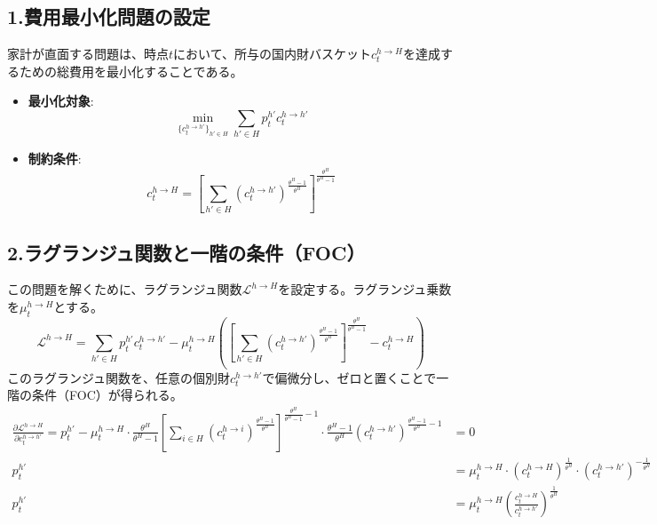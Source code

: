 \subsection*{1.費用最小化問題の設定}
\label{sec:appendix_cost_minimization_sub1}
家計が直面する問題は、時点\(t\)において、所与の国内財バスケット\(c_t^{h\to H}\)を達成するための総費用を最小化することである。
\begin{itemize}
    \item\label{itm:appendix_cost_minimization_sub1_obj} \textbf{最小化対象}:
    \begin{equation}
    \min_{\{c_t^{h\to h'}\}_{h'\in H}}\sum_{h'\in H}p_t^{h'}c_t^{h\to h'}
    \label{eq:appendix_cost_minimization_sub1_objective}
    \end{equation}
    \item\label{itm:appendix_cost_minimization_sub1_const} \textbf{制約条件}:
    \begin{equation}
    c_t^{h\to H}=\left[\sum_{h'\in H}(c_t^{h\to h'})^{\frac{\theta^H-1}{\theta^H}}\right]^{\frac{\theta^H}{\theta^H-1}}
    \label{eq:appendix_cost_minimization_sub1_constraint}
    \end{equation}
\end{itemize}

\subsection*{2.ラグランジュ関数と一階の条件（FOC）}
\label{sec:appendix_cost_minimization_sub2}
この問題を解くために、ラグランジュ関数\(\mathcal{L}^{h\to H}\)を設定する。ラグランジュ乗数を\(\mu_t^{h\to H}\)とする。
\begin{equation}
\mathcal{L}^{h\to H}=\sum_{h'\in H}p_t^{h'}c_t^{h\to h'}-\mu_t^{h\to H}\left(\left[\sum_{h'\in H}(c_t^{h\to h'})^{\frac{\theta^H-1}{\theta^H}}\right]^{\frac{\theta^H}{\theta^H-1}}-c_t^{h\to H}\right)
\label{eq:appendix_cost_minimization_sub2_lagrangian}
\end{equation}
このラグランジュ関数を、任意の個別財\(c_t^{h\to h'}\)で偏微分し、ゼロと置くことで一階の条件（FOC）が得られる。
\begin{align}
\frac{\partial\mathcal{L}^{h\to H}}{\partial c_t^{h\to h'}}=p_t^{h'}-\mu_t^{h\to H}\cdot\frac{\theta^H}{\theta^H-1}\left[\sum_{i\in H}(c_t^{h\to i})^{\frac{\theta^H-1}{\theta^H}}\right]^{\frac{\theta^H}{\theta^H-1}-1}\cdot\frac{\theta^H-1}{\theta^H}(c_t^{h\to h'})^{\frac{\theta^H-1}{\theta^H}-1}&=0 \label{eq:appendix_cost_minimization_sub2_foc_step1} \\
p_t^{h'}&=\mu_t^{h\to H}\cdot(c_t^{h\to H})^{\frac{1}{\theta^H}}\cdot(c_t^{h\to h'})^{-\frac{1}{\theta^H}} \label{eq:appendix_cost_minimization_sub2_foc_step2} \\
p_t^{h'}&=\mu_t^{h\to H}\left(\frac{c_t^{h\to H}}{c_t^{h\to h'}}\right)^{\frac{1}{\theta^H}}
\label{eq:appendix_cost_minimization_sub2_foc_final}
\end{align}


